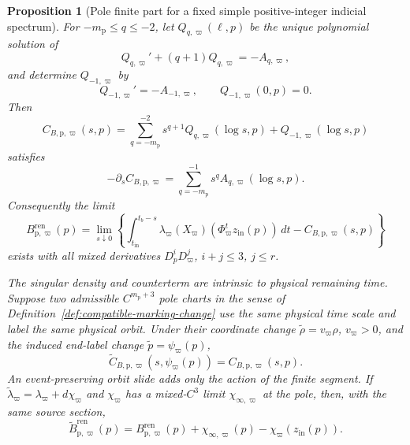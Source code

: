 \documentclass[11pt]{amsart}
\numberwithin{equation}{section}
\newtheorem{proposition}[theorem]{Proposition}
\theoremstyle{definition}
\theoremstyle{remark}
\begin{document}
\begin{proposition}[Pole finite part for a fixed simple positive-integer
indicial spectrum]
For $-m_{\mathrm p}\le q\le-2$, let
$Q_{q,\varpi}(\ell,p)$ be the unique polynomial
solution of
\begin{equation}\label{eq:pole-counterterm-polynomial}
 Q_{q,\varpi}'+(q+1)Q_{q,\varpi}=-A_{q,\varpi},
\end{equation}
and determine $Q_{-1,\varpi}$ by
\begin{equation}\label{eq:pole-log-counterterm-polynomial}
 Q_{-1,\varpi}'=-A_{-1,\varpi},
 \qquad Q_{-1,\varpi}(0,p)=0.
\end{equation}
Then
\begin{equation}\label{eq:varying-pole-counterterm}
 C_{B,\mathrm p,\varpi}(s,p)
 =\sum_{q=-m_{\mathrm p}}^{-2}s^{q+1}Q_{q,\varpi}(\log s,p)
   +Q_{-1,\varpi}(\log s,p)
\end{equation}
satisfies
\begin{equation}\label{eq:varying-pole-counterterm-derivative}
 -\partial_sC_{B,\mathrm p,\varpi}
 =\sum_{q=-m_{\mathrm p}}^{-1}s^qA_{q,\varpi}(\log s,p).
\end{equation}
Consequently the limit
\begin{equation}\label{eq:varying-pole-renormalized-action}
 B_{\mathrm p,\varpi}^{\mathrm{ren}}(p)
 =\lim_{s\downarrow0}\left\{
  \int_{t_{\mathrm{in}}}^{t_b-s}
       \lambda_\varpi(X_\varpi)
       (\Phi_\varpi^tz_{\mathrm{in}}(p))\,dt
  -C_{B,\mathrm p,\varpi}(s,p)\right\}
\end{equation}
exists with all mixed derivatives
$D_p^iD_\varpi^j$, $i+j\le3$, $j\le r$.

The singular density and counterterm are intrinsic to physical remaining
time.  Suppose two admissible $C^{m_{\mathrm p}+3}$ pole charts in the sense of
Definition~\ref{def:compatible-marking-change} use the same physical time
scale and label the same physical orbit.  Under their coordinate change
$\widetilde\rho=v_\varpi\rho$, $v_\varpi>0$, and the induced end-label
change $\widetilde p=\psi_\varpi(p)$,
\begin{equation}\label{eq:pole-counterterm-coordinate-transfer}
 \widetilde C_{B,\mathrm p,\varpi}
       (s,\psi_\varpi(p))
 =C_{B,\mathrm p,\varpi}(s,p).
\end{equation}
An event-preserving orbit slide adds only the action of the finite segment.
If $\widetilde\lambda_\varpi=\lambda_\varpi+d\chi_\varpi$ and
$\chi_\varpi$ has a mixed-$C^3$ limit $\chi_{\infty,\varpi}$ at the pole,
then, with the same source section,
\begin{equation}\label{eq:pole-exact-gauge-transfer}
 \widetilde B_{\mathrm p,\varpi}^{\mathrm{ren}}(p)
 =B_{\mathrm p,\varpi}^{\mathrm{ren}}(p)
  +\chi_{\infty,\varpi}(p)
  -\chi_\varpi(z_{\mathrm{in}}(p)).
\end{equation}
\end{proposition}
\end{document}
